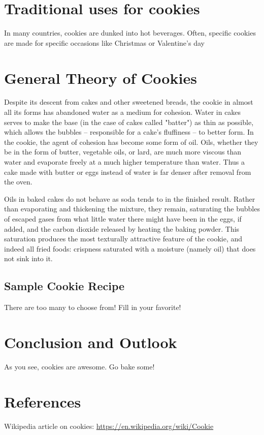 \documentclass[a4paper]{article}
\begin{document}
\section{Traditional uses for cookies}
In many countries, cookies are dunked into hot beverages.
Often, specific cookies are made for specific occasions like Christmas or Valentine's day

\section{General Theory of Cookies}
Despite its descent from cakes and other sweetened breads, the cookie in almost all its forms has abandoned water as a medium for cohesion. 
Water in cakes serves to make the base (in the case of cakes called "batter") as thin as possible, which allows the bubbles – responsible for a cake's fluffiness – to better form. 
In the cookie, the agent of cohesion has become some form of oil. 
Oils, whether they be in the form of butter, vegetable oils, or lard, are much more viscous than water and evaporate freely at a much higher temperature than water. 
Thus a cake made with butter or eggs instead of water is far denser after removal from the oven.

Oils in baked cakes do not behave as soda tends to in the finished result. 
Rather than evaporating and thickening the mixture, they remain, saturating the bubbles of escaped gases from what little water there might have been in the eggs, if added, and the carbon dioxide released by heating the baking powder. 
This saturation produces the most texturally attractive feature of the cookie, and indeed all fried foods: crispness saturated with a moisture (namely oil) that does not sink into it. 

\subsection{Sample Cookie Recipe}
There are too many to choose from! Fill in your favorite!

\section{Conclusion and Outlook}
As you see, cookies are awesome. Go bake some!

\section{References}
Wikipedia article on cookies: \url{https://en.wikipedia.org/wiki/Cookie}
\end{document}
